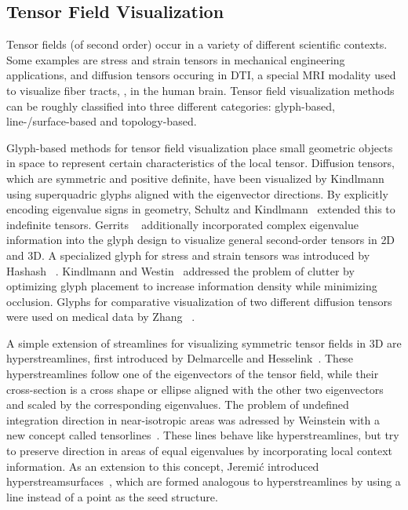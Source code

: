 \subsection*{Tensor Field Visualization} %
\label{sub:tcl_tensor_field_visualization}
%
Tensor fields (of second order) occur in a variety of different scientific
contexts.
%
Some examples are stress and strain tensors in mechanical engineering
applications, and diffusion tensors occuring in \ac{DTI}, a special \ac{MRI}
modality used to visualize fiber tracts, \eg, in the human brain.
%
Tensor field visualization methods can be roughly classified into three
different categories:
%
glyph-based, line-/surface-based and topology-based.
%

%
Glyph-based methods for tensor field visualization place small geometric objects
in space to represent certain characteristics of the local tensor.
%
Diffusion tensors, which are symmetric and positive definite, have been
visualized by Kindlmann~\cite{Kindlmann2004} using superquadric glyphs
aligned with the eigenvector directions.
%
By explicitly encoding eigenvalue signs in geometry, Schultz and
Kindlmann~\cite{Schultz2010a} extended this to indefinite tensors.
%
Gerrits \etal~\cite{Gerrits2017} additionally incorporated complex eigenvalue
information into the glyph design to visualize general second-order tensors
in \ac{2D} and \ac{3D}.
%
A specialized glyph for stress and strain tensors was introduced by Hashash
\etal~\cite{Hashash2003}.
%
Kindlmann and Westin~\cite{Kindlmann2006} addressed the problem of clutter by
optimizing glyph placement to increase information density while minimizing
occlusion.
%
Glyphs for comparative visualization of two different diffusion tensors were
used on medical data by Zhang \etal~\cite{Zhang2016}.
%

%
A simple extension of streamlines for visualizing symmetric tensor fields in \ac{3D}
are hyperstreamlines, first introduced by Delmarcelle and
Hesselink~\cite{Delmarcelle1993}.
%
These hyperstreamlines follow one of the eigenvectors of the tensor field, while
their cross-section is a cross shape or ellipse aligned with the other two
eigenvectors and scaled by the corresponding eigenvalues.
%
The problem of undefined integration direction in near-isotropic areas was
adressed by Weinstein \etal with a new concept called
tensorlines~\cite{Weinstein1999}.
%
These lines behave like hyperstreamlines, but try to preserve direction in areas
of equal eigenvalues by incorporating local context information.
%
As an extension to this concept, Jeremi{\'c} \etal introduced
hyperstreamsurfaces~\cite{Jeremic2002}, which are formed analogous to
hyperstreamlines by using a line instead of a point as the seed structure.
%

